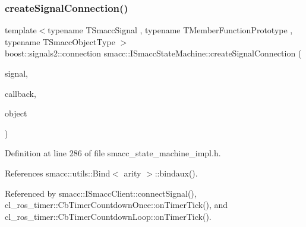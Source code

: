 \subsubsection{\texorpdfstring{create\+Signal\+Connection()}{createSignalConnection()}}
{\footnotesize\ttfamily template$<$typename T\+Smacc\+Signal , typename T\+Member\+Function\+Prototype , typename T\+Smacc\+Object\+Type $>$ \\
boost\+::signals2\+::connection smacc\+::\+I\+Smacc\+State\+Machine\+::create\+Signal\+Connection (\begin{DoxyParamCaption}\item[{T\+Smacc\+Signal \&}]{signal,  }\item[{T\+Member\+Function\+Prototype}]{callback,  }\item[{T\+Smacc\+Object\+Type $\ast$}]{object }\end{DoxyParamCaption})}



Definition at line 286 of file smacc\+\_\+state\+\_\+machine\+\_\+impl.\+h.



References smacc\+::utils\+::\+Bind$<$ arity $>$\+::bindaux().



Referenced by smacc\+::\+I\+Smacc\+Client\+::connect\+Signal(), cl\+\_\+ros\+\_\+timer\+::\+Cb\+Timer\+Countdown\+Once\+::on\+Timer\+Tick(), and cl\+\_\+ros\+\_\+timer\+::\+Cb\+Timer\+Countdown\+Loop\+::on\+Timer\+Tick().


